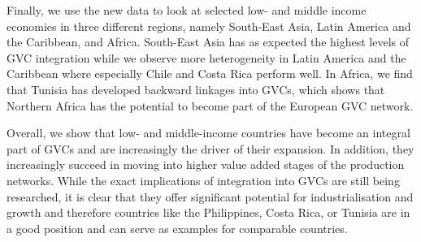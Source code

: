 \documentclass[11pt,a4paper]{article}
\begin{document}
Finally, we use the new data to look at selected low- and middle income economies in three different regions, namely South-East Asia, Latin America and the Caribbean, and Africa. South-East Asia has as expected the highest levels of GVC integration while we observe more heterogeneity in Latin America and the Caribbean where especially Chile and Costa Rica perform well. In Africa, we find that Tunisia has developed backward linkages into GVCs, which shows that Northern Africa has the potential to become part of the European GVC network.

Overall, we show that low- and middle-income countries have become an integral part of GVCs and are increasingly the driver of their expansion. In addition, they increasingly succeed in moving into higher value added stages of the production networks. While the exact implications of integration into GVCs are still being researched, it is clear that they offer significant potential for industrialisation and growth and therefore countries like the Philippines, Costa Rica, or Tunisia are in a good position and can serve as examples for comparable countries.


\clearpage




\clearpage

 \appendix
 
\end{document}
